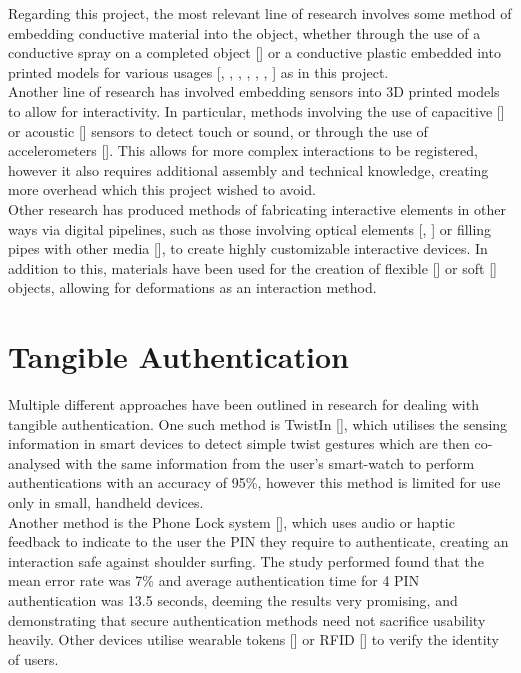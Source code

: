 \documentclass{l4proj}
\begin{document}
Regarding this project, the most relevant line of research involves some method of embedding conductive material into the object, whether through the use of a conductive spray on a completed object [\cite{10.1145/2556288.2557046}] or a conductive plastic embedded into printed models for various usages [\cite{10.1145/1979742.1979773}, \cite{10.1145/2207676.2208371}, \cite{schmitz2021itsy}, \cite{schmitz2018off}, \cite{marky20203d}, \cite{leigh2012simple}, \cite{kato20163d}] as in this project.\\
Another line of research has involved embedding sensors into 3D printed models to allow for interactivity. In particular, methods involving the use of capacitive [\cite{10.1145/2207676.2207743}] or acoustic [\cite{10.1145/2501988.2501989}] sensors to detect touch or sound, or through the use of accelerometers [\cite{10.1145/2559206.2581137}]. This allows for more complex interactions to be registered, however it also requires additional assembly and technical knowledge, creating more overhead which this project wished to avoid.\\
Other research has produced methods of fabricating interactive elements in other ways via digital pipelines, such as those involving optical elements [\cite{brockmeyer2013papillon}, \cite{willis2012printed}] or filling pipes with other media [\cite{savage2014series}], to create highly customizable interactive devices. In addition to this, materials have been used for the creation of flexible [\cite{schmitz2017flexibles}] or soft [\cite{peng2015layered}] objects, allowing for deformations as an interaction method.


\section{Tangible Authentication}

Multiple different approaches have been outlined in research for dealing with tangible authentication. One such method is TwistIn [\cite{leung2018twistin}], which utilises the sensing information in smart devices to detect simple twist gestures which are then co-analysed with the same information from the user's smart-watch to perform authentications with an accuracy of 95\%, however this method is limited for use only in small, handheld devices. \\
Another method is the Phone Lock system [\cite{bianchi2010phone}], which uses audio or haptic feedback to indicate to the user the PIN they require to authenticate, creating an interaction safe against shoulder surfing. The study performed found that the mean error rate was 7\% and average authentication time for 4 PIN authentication was 13.5 seconds, deeming the results very promising, and demonstrating that secure authentication methods need not sacrifice usability heavily.
Other devices utilise wearable tokens [\cite{chen2008tangible}] or RFID [\cite{klompmaker2012authenticated}] to verify the identity of users.
\end{document}
